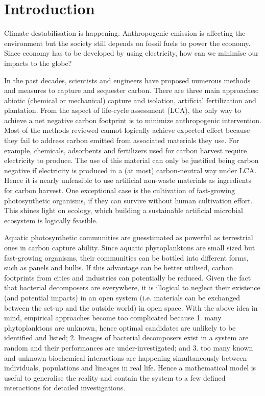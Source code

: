 \documentclass[../thesis.tex]{subfiles} %
\begin{document}
\section{Introduction}

Climate destabilisation is happening.\autocite{notz2016observed,schuur2015climate}  Anthropogenic emission is affecting the environment\autocite{notz2016observed} but the society still depends on fossil fuels to power the economy.\autocite{lotfalipour2010economic}  Since economy has to be developed by using electricity,\autocite{ferguson2000electricity} how can we minimise our impacts to the globe?

In the past decades, scientists and engineers have proposed numerous methods and measures to capture and sequester carbon.\autocite{farrelly2013carbon,yang2008progress}  There are three main approaches: abiotic (chemical or mechanical) capture and isolation, artificial fertilization and plantation.  From the aspect of life-cycle assessment (LCA), the only way to achieve a net negative carbon footprint is to minimize anthropogenic intervention.  Most of the methods reviewed cannot logically achieve expected effect because they fail to address carbon emitted from associated materials they use.  For example, chemicals, adsorbents and fertilizers used for carbon harvest require electricity to produce.  The use of this material can only be justified being carbon negative if electricity is produced in a (at most) carbon-neutral way under LCA.  Hence it is nearly unfeasible to use artificial non-waste materials as ingredients for carbon harvest.  One exceptional case is the cultivation of fast-growing photosynthetic organisms,\autocite{farrelly2013carbon} if they can survive without human cultivation effort.  This shines light on ecology, which building a sustainable artificial microbial ecosystem is logically feasible.

Aquatic photosynthetic communities are guesstimated as powerful as terrestrial ones in carbon capture ability.\autocite{SCHLESINGER2013341}  Since aquatic phytoplanktons are small sized but fast-growing organisms, their communities can be bottled into different forms, such as panels and bulbs\autocite{evanson_2019}.  If this advantage can be better utilised, carbon footprints from cities and industries can potentially be reduced.  Given the fact that bacterial decomposers are everywhere, it is illogical to neglect their existence (and potential impacts) in an open system (i.e. materials can be exchanged between the set-up and the outside world) in open space.  With the above idea in mind, empirical approaches become too complicated because 1. many phytoplanktons are unknown, hence optimal candidates are unlikely to be identified and listed; 2. lineages of bacterial decomposers exist in a system are random and their performances are under-investigated; and 3. too many known and unknown biochemical interactions are happening simultaneously between individuals, populations and lineages in real life.  Hence a mathematical model is useful to generalise the reality and contain the system to a few defined interactions for detailed investigations.
\end{document}
